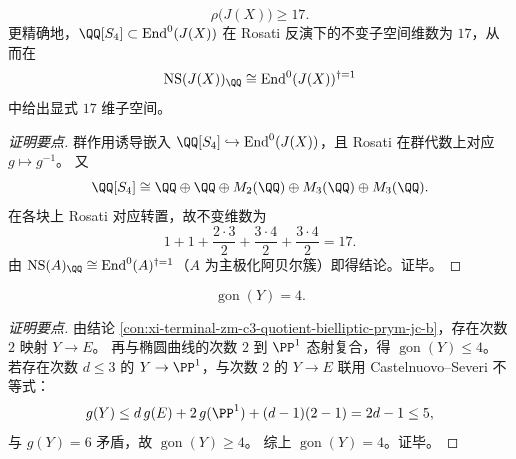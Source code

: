 \begin{conclusion}\label{con:xi-terminal-zm-jacobian-neron-severi-rank-lower-bound-17}
\[
\rho\!\bigl(J(X)\bigr)\ge 17.
\]
更精确地，\(\QQ[S_4]\subset \operatorname{End}^0(J(X))\) 在 Rosati 反演下的不变子空间维数为 \(17\)，从而在
\[
\mathrm{NS}(J(X))_{\QQ}\cong \operatorname{End}^0(J(X))^{\dagger=1}
\]
中给出显式 \(17\) 维子空间。
\end{conclusion}
\begin{proof}[证明要点]
群作用诱导嵌入 \(\QQ[S_4]\hookrightarrow \operatorname{End}^0(J(X))\)，且 Rosati 在群代数上对应 \(g\mapsto g^{-1}\)。
又
\[
\QQ[S_4]\cong \QQ\oplus \QQ\oplus M_2(\QQ)\oplus M_3(\QQ)\oplus M_3(\QQ).
\]
在各块上 Rosati 对应转置，故不变维数为
\[
1+1+\frac{2\cdot3}{2}+\frac{3\cdot4}{2}+\frac{3\cdot4}{2}=17.
\]
由 \(\mathrm{NS}(A)_{\QQ}\cong \operatorname{End}^0(A)^{\dagger=1}\)（\(A\) 为主极化阿贝尔簇）即得结论。证毕。
\end{proof}

\begin{conclusion}[三循环商曲线的四割性]\label{con:xi-terminal-zm-c3-quotient-gonality-four}
\[
\operatorname{gon}(Y)=4.
\]
\end{conclusion}
\begin{proof}[证明要点]
由结论 \ref{con:xi-terminal-zm-c3-quotient-bielliptic-prym-jc-b}，存在次数 \(2\) 映射 \(Y\to E\)。
再与椭圆曲线的次数 \(2\) 到 \(\PP^1\) 态射复合，得 \(\operatorname{gon}(Y)\le 4\)。
若存在次数 \(d\le 3\) 的 \(Y\to \PP^1\)，与次数 \(2\) 的 \(Y\to E\) 联用 Castelnuovo--Severi 不等式：
\[
g(Y)\le d\,g(E)+2\,g(\PP^1)+(d-1)(2-1)=2d-1\le 5,
\]
与 \(g(Y)=6\) 矛盾，故 \(\operatorname{gon}(Y)\ge 4\)。
综上 \(\operatorname{gon}(Y)=4\)。证毕。
\end{proof}
